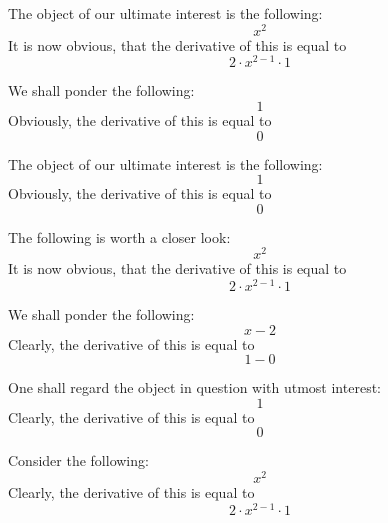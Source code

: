 \documentclass{article}
\begin{document}
The object of our ultimate interest is the following:
\begin{equation}
x ^{2 } 
\end{equation}
It is now obvious, that the derivative of this is equal to
\begin{equation}
2 \cdot x ^{2 - 1 } \cdot 1 
\end{equation}

We shall ponder the following:
\begin{equation}
1 
\end{equation}
Obviously, the derivative of this is equal to
\begin{equation}
0 
\end{equation}

The object of our ultimate interest is the following:
\begin{equation}
1 
\end{equation}
Obviously, the derivative of this is equal to
\begin{equation}
0 
\end{equation}

The following is worth a closer look:
\begin{equation}
x ^{2 } 
\end{equation}
It is now obvious, that the derivative of this is equal to
\begin{equation}
2 \cdot x ^{2 - 1 } \cdot 1 
\end{equation}

We shall ponder the following:
\begin{equation}
x - 2 
\end{equation}
Clearly, the derivative of this is equal to
\begin{equation}
1 - 0 
\end{equation}

One shall regard the object in question with utmost interest:
\begin{equation}
1 
\end{equation}
Clearly, the derivative of this is equal to
\begin{equation}
0 
\end{equation}

Consider the following:
\begin{equation}
x ^{2 } 
\end{equation}
Clearly, the derivative of this is equal to
\begin{equation}
2 \cdot x ^{2 - 1 } \cdot 1 
\end{equation}
\end{document}
